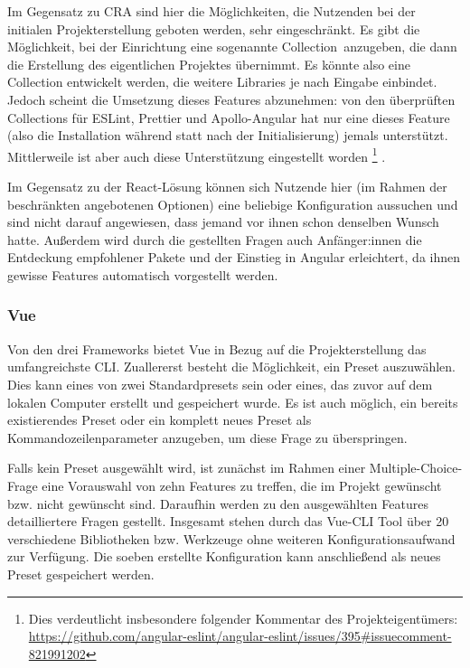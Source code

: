 Im Gegensatz zu \gls{CRA} sind hier die Möglichkeiten, die Nutzenden bei der initialen Projekterstellung geboten werden, sehr eingeschränkt. Es gibt die Möglichkeit, bei der Einrichtung eine sogenannte \glqq Collection\grqq\ anzugeben, die dann die Erstellung des eigentlichen Projektes übernimmt. Es könnte also eine Collection entwickelt werden, die weitere Libraries je nach Eingabe einbindet. Jedoch scheint die Umsetzung dieses Features abzunehmen: von den überprüften Collections für ESLint, Prettier und Apollo-Angular hat nur eine dieses Feature (also die Installation während statt nach der Initialisierung) jemals unterstützt. Mittlerweile ist aber auch diese Unterstützung eingestellt worden \cite{prettier_angular_collection_file} \cite{angular_eslint}\footnote{Dies verdeutlicht insbesondere folgender Kommentar des Projekteigentümers: \url{https://github.com/angular-eslint/angular-eslint/issues/395\#issuecomment-821991202}} \cite{apollo_angular_collection_file}.

Im Gegensatz zu der React-Lösung können sich Nutzende hier (im Rahmen der beschränkten angebotenen Optionen) eine beliebige Konfiguration aussuchen und sind nicht darauf angewiesen, dass jemand vor ihnen schon denselben Wunsch hatte. Außerdem wird durch die gestellten Fragen auch Anfänger:innen die Entdeckung empfohlener Pakete und der Einstieg in Angular erleichtert, da ihnen gewisse Features automatisch vorgestellt werden.


\subsubsection{Vue}
Von den drei Frameworks bietet Vue in Bezug auf die Projekterstellung das umfangreichste \gls{CLI}. Zuallererst besteht die Möglichkeit, ein Preset auszuwählen. Dies kann eines von zwei Standardpresets sein oder eines, das zuvor auf dem lokalen Computer erstellt und gespeichert wurde. Es ist auch möglich, ein bereits existierendes Preset oder ein komplett neues Preset als Kommandozeilenparameter anzugeben, um diese Frage zu überspringen.

Falls kein Preset ausgewählt wird, ist zunächst im Rahmen einer Multiple-Choice-Frage eine Vorauswahl von zehn Features zu treffen, die im Projekt gewünscht bzw. nicht gewünscht sind. Daraufhin werden zu den ausgewählten Features detailliertere Fragen gestellt. Insgesamt stehen durch das Vue-\gls{CLI} Tool über 20 verschiedene Bibliotheken bzw. Werkzeuge ohne weiteren Konfigurationsaufwand zur Verfügung. Die soeben erstellte Konfiguration kann anschließend als neues Preset gespeichert werden.

